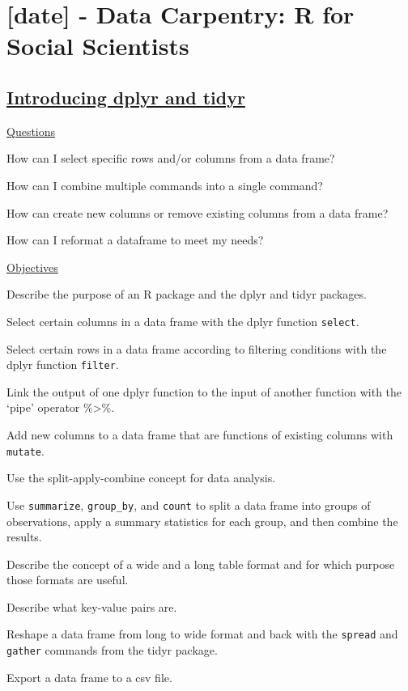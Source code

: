 \documentclass[12pt]{article}
\begin{document}
\newpage\flushleft\section{[date] - Data Carpentry: R for Social Scientists}
\subsection{\href{https://datacarpentry.org/r-socialsci/03-dplyr-tidyr/index.html}{\textbf{Introducing dplyr and tidyr}}}
\color{gray}
\underline{Questions}

How can I select specific rows and/or columns from a data frame?

How can I combine multiple commands into a single command?

How can create new columns or remove existing columns from a data frame?

How can I reformat a dataframe to meet my needs?

\underline{Objectives}

Describe the purpose of an R package and the dplyr and tidyr packages.

Select certain columns in a data frame with the dplyr function \texttt{select}.

Select certain rows in a data frame according to filtering conditions with the dplyr function \texttt{filter}.

Link the output of one dplyr function to the input of another function with the ‘pipe’ operator \%\textgreater\%.

Add new columns to a data frame that are functions of existing columns with \texttt{mutate}.

Use the split-apply-combine concept for data analysis.

Use \texttt{summarize}, \texttt{group\_by}, and \texttt{count} to split a data frame into groups of observations, apply a summary statistics for each group, and then combine the results.

Describe the concept of a wide and a long table format and for which purpose those formats are useful.

Describe what key-value pairs are.

Reshape a data frame from long to wide format and back with the \texttt{spread} and \texttt{gather} commands from the tidyr package.

Export a data frame to a csv file.

\color{black}
\vspace{1em}
\end{document}
